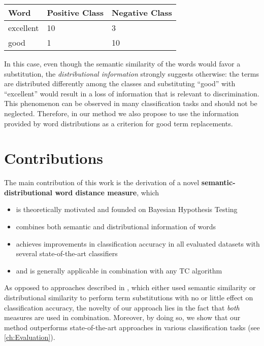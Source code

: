 \begin{center}
\begin{tabular}{l|l|l}
\textbf{Word} & \textbf{Positive Class} & \textbf{Negative Class}  \\
\hline
excellent & 10 & 3 \\
good & 1 & 10 \\
\end{tabular}
\end{center}

In this case, even though the semantic similarity of the words would favor a
substitution, the \emph{distributional information} strongly suggests otherwise:
the terms are distributed differently among the classes and substituting ``good'' with
``excellent'' would result in a loss of information that is relevant to 
discrimination. 
This phenomenon can be observed in many classification tasks and
should not be neglected. Therefore, in our method we also propose to use 
the information provided by word distributions as a criterion for good term 
replacements. 

\section{Contributions}
\label{sec:contributions}
The main contribution of this work is the derivation of a novel \textbf{semantic-distributional word distance measure}, 
which 
\begin{itemize}
  
  \item is theoretically motivated and founded on Bayesian Hypothesis Testing
  \item combines both semantic and distributional information of words
  \item achieves improvements in classification
  accuracy in all evaluated datasets with several state-of-the-art classifiers
  \item and is generally applicable in combination with any TC algorithm
\end{itemize}

As opposed to approaches described in \cite{wang2016semantic,
baker1998distributional}, which either used semantic similarity or distributional similarity 
to perform term substitutions with no or little effect on classification
accuracy, the novelty of our approach lies in the fact that \emph{both} measures
are used in combination. Moreover, by doing so, we show that our method
outperforms state-of-the-art approaches in various classification tasks (see \ref{ch:Evaluation}). 

